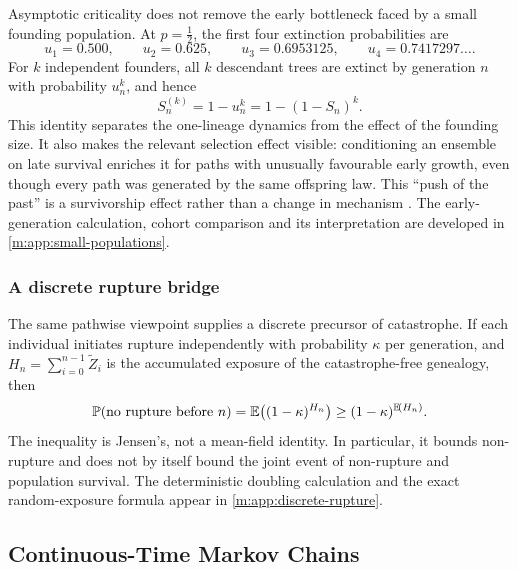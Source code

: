 Asymptotic criticality does not remove the early bottleneck faced by a small
founding population.  At $p=\tfrac12$, the first four extinction probabilities
are
\[
  u_1=0.500,\qquad u_2=0.625,\qquad
  u_3=0.6953125,\qquad u_4=0.7417297\ldots.
\]
For $k$ independent founders, all $k$ descendant trees are extinct by generation
$n$ with probability $u_n^k$, and hence
\begin{equation}
  S_n^{(k)}=1-u_n^k=1-(1-S_n)^k.
  \label{m:eq:k-founder-survival}
\end{equation}
This identity separates the one-lineage dynamics from the effect of the founding
size.  It also makes the relevant selection effect visible: conditioning an
ensemble on late survival enriches it for paths with unusually favourable early
growth, even though every path was generated by the same offspring law.  This
``push of the past'' is a survivorship effect rather than a change in mechanism
\cite{Budd2018}.  The early-generation calculation, cohort comparison and its
interpretation are developed in \cref{m:app:small-populations}.

\subsubsection{A discrete rupture bridge}
\label{m:sec:discrete-rupture-bridge}

The same pathwise viewpoint supplies a discrete precursor of catastrophe.  If
each individual initiates rupture independently with probability $\kappa$ per
generation, and $H_n=\sum_{i=0}^{n-1}\widetilde Z_i$ is the accumulated exposure
of the catastrophe-free genealogy, then
\begin{equation}
  \mathbb{P}\!\left(\text{no rupture before }n\right)
  =\mathbb{E}\!\left((1-\kappa)^{H_n}\right)
  \geq (1-\kappa)^{\mathbb{E}\!\left(H_n\right)}.
  \label{m:eq:rupture-jensen-summary}
\end{equation}
The inequality is Jensen's, not a mean-field identity.  In particular, it bounds
non-rupture and does not by itself bound the joint event of non-rupture and
population survival.  The deterministic doubling calculation and the exact
random-exposure formula appear in \cref{m:app:discrete-rupture}.

\subsection{Continuous-Time Markov Chains}\label{m:sec:ctmc}

